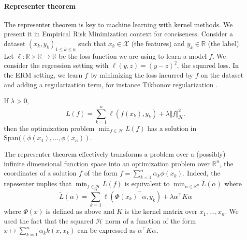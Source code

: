 \paragraph{Representer theorem} The representer theorem is key to machine learning with kernel methods. We present it in Empirical Risk Minimization context for conciseness. Consider a dataset $(x_k, y_k)_{1\leq k\leq n}$ such that $x_k\in\mathcal X$ (the features) and $y_k\in\mathbb R$ (the label). Let $\ell: \mathbb R \times\mathbb R\to\mathbb R$ be the loss function we are using to learn a model $f$. We consider the regression setting with $\ell(y, z) = (y - z) ^2$, the squared loss. In the ERM setting, we learn $f$ by minimizing the loss incurred by $f$ on the dataset and adding a regularization term, for instance Tikhonov regularization \citep{devroye1996probabilistic}.

\begin{mdframed}
\begin{theorem}If $\lambda > 0$,
\begin{equation}
    L(f) = \sum_{k=1}^n \ell(f(x_k), y_k) + \lambda \Vert f \Vert_\mathcal H^2.
\end{equation}
then the optimization problem $\min_{f\in\mathcal H}L(f)$ has a solution in $\mathrm{Span}((\phi(x_1), \ldots, \phi(x_n))$.
\end{theorem}
\end{mdframed}

The representer theorem effectively transforms a problem over a (possibly) infinite dimensional function space into an optimization problem over $\mathbb R^n$, the coordinates of a solution $f$ of the form $f= \sum_{k=1}^n \alpha_k \phi(x_k)$. Indeed, the repesenter implies that $\min_{f\in\mathcal H}L(f)$ is equivalent to $\min_{\alpha\in\mathbb R^n}\tilde L(\alpha)$ where
\begin{equation}
\tilde L(\alpha) = \sum_{k=1}^n \ell(\Phi(x_k)^\top\alpha, y_k) + \lambda \alpha^\top K \alpha
\end{equation} where $\Phi(x)$ is defined as above and $K$ is the kernel matrix over $x_1, \ldots, x_n$. We used the fact that the squared $\mathcal H$ norm of a function of the form $x \mapsto \sum_{k=1}^n \alpha_k k(x, x_k)$ can be expressed as $\alpha^\top K \alpha$.

